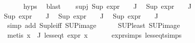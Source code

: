 \begin{isabellebody}
\ \ \ \ \isamarkupfalse%
\ {\isachardoublequoteopen}{}{\isachardot}{\kern0pt}hyps{\isachardoublequoteclose}\ \isamarkupfalse%
\ blast\isanewline
\ \ \isamarkupfalse%
\ sup{\isacharunderscore}{\kern0pt}j{\isacharcolon}{\kern0pt}\ {\isachardoublequoteopen}Sup\ {\isacharparenleft}{\kern0pt}{\isacharparenleft}{\kern0pt}expr{\isacharunderscore}{\kern0pt}{}\ {\isasymcirc}\ {\isasymPhi}{\isacharparenright}{\kern0pt}\ {\isacharbackquote}{\kern0pt}\ J{\isacharparenright}{\kern0pt}\ {\isasymle}\ {}{\isachardoublequoteclose}\isanewline
{\isachardoublequoteopen}Sup\ {\isacharparenleft}{\kern0pt}{\isacharparenleft}{\kern0pt}expr{\isacharunderscore}{\kern0pt}{}\ {\isasymcirc}\ {\isasymPhi}{\isacharparenright}{\kern0pt}\ {\isacharbackquote}{\kern0pt}\ J{\isacharparenright}{\kern0pt}\ {\isasymle}\ {}{\isachardoublequoteclose}\isanewline
{\isachardoublequoteopen}Sup\ {\isacharparenleft}{\kern0pt}{\isacharparenleft}{\kern0pt}expr{\isacharunderscore}{\kern0pt}{}\ {\isasymcirc}\ {\isasymPhi}{\isacharparenright}{\kern0pt}\ {\isacharbackquote}{\kern0pt}\ J{\isacharparenright}{\kern0pt}\ {\isasymle}\ {}{\isachardoublequoteclose}\isanewline
{\isachardoublequoteopen}Sup\ {\isacharparenleft}{\kern0pt}{\isacharparenleft}{\kern0pt}expr{\isacharunderscore}{\kern0pt}{}\ {\isasymcirc}\ {\isasymPhi}{\isacharparenright}{\kern0pt}\ {\isacharbackquote}{\kern0pt}\ J{\isacharparenright}{\kern0pt}\ {\isasymle}\ {}{\isachardoublequoteclose}\isanewline
{\isachardoublequoteopen}Sup\ {\isacharparenleft}{\kern0pt}{\isacharparenleft}{\kern0pt}expr{\isacharunderscore}{\kern0pt}{}\ {\isasymcirc}\ {\isasymPhi}{\isacharparenright}{\kern0pt}\ {\isacharbackquote}{\kern0pt}\ J{\isacharparenright}{\kern0pt}\ {\isasymle}\ {}{\isachardoublequoteclose}\isanewline
\ \ \ \ \ \ \ \ \isamarkupfalse%
\ {\isacharparenleft}{\kern0pt}simp\ add{\isacharcolon}{\kern0pt}\ Sup{\isacharunderscore}{\kern0pt}le{\isacharunderscore}{\kern0pt}iff\ SUP{\isacharunderscore}{\kern0pt}image{\isacharparenright}{\kern0pt}\isanewline
\ \ \ \ \isamarkupfalse%
\ SUP{\isacharunderscore}{\kern0pt}least\ SUP{\isacharunderscore}{\kern0pt}image\isanewline
\ \ \ \ \isamarkupfalse%
\ {\isacharparenleft}{\kern0pt}metis\ {\isacartoucheopen}{\isasymforall}x{\isasymin}{\isasymPhi}\ {\isacharbackquote}{\kern0pt}\ J{\isachardot}{\kern0pt}\ less{\isacharunderscore}{\kern0pt}eq{\isacharunderscore}{\kern0pt}t\ {\isacharparenleft}{\kern0pt}expr\ x{\isacharparenright}{\kern0pt}\ {\isacharparenleft}{\kern0pt}{}{\isacharcomma}{\kern0pt}\ {\isasyminfinity}{\isacharcomma}{\kern0pt}\ {}{\isacharcomma}{\kern0pt}\ {}{\isacharcomma}{\kern0pt}\ {}{\isacharcomma}{\kern0pt}\ {}{\isacharparenright}{\kern0pt}{\isacartoucheclose}\ expr{\isachardot}{\kern0pt}simps\ less{\isacharunderscore}{\kern0pt}eq{\isacharunderscore}{\kern0pt}t{\isachardot}{\kern0pt}simps{\isacharparenright}{\kern0pt}{\isacharplus}{\kern0pt}\isanewline

\end{isabellebody}

